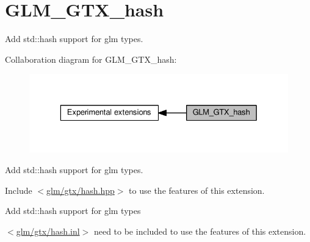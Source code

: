 \hypertarget{group__gtx__hash}{}\section{G\+L\+M\+\_\+\+G\+T\+X\+\_\+hash}
\label{group__gtx__hash}


Add std\+::hash support for glm types.  


Collaboration diagram for G\+L\+M\+\_\+\+G\+T\+X\+\_\+hash\+:
\nopagebreak
\begin{figure}[H]
\begin{center}
\leavevmode
\includegraphics[width=329pt]{d2/da2/group__gtx__hash}
\end{center}
\end{figure}
Add std\+::hash support for glm types. 

Include $<$\hyperlink{hash_8hpp}{glm/gtx/hash.\+hpp}$>$ to use the features of this extension.

Add std\+::hash support for glm types

$<$\hyperlink{hash_8inl}{glm/gtx/hash.\+inl}$>$ need to be included to use the features of this extension. 